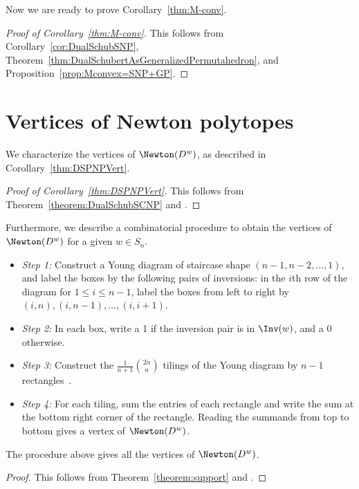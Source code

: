 Now we are ready to prove Corollary~\ref{thm:M-conv}. 
\begin{proof}[Proof of Corollary~\ref{thm:M-conv}]
    This follows from Corollary~\ref{cor:DualSchubSNP}, Theorem~\ref{thm:DualSchubertAsGeneralizedPermutahedron}, and Proposition~\ref{prop:Mconvex=SNP+GP}.
\end{proof}


\section{Vertices of Newton polytopes}\label{section:vertices}

We characterize the vertices of $\Newton(D^w)$, as described in Corollary~\ref{thm:DSPNPVert}.

\begin{proof}[Proof of Corollary~\ref{thm:DSPNPVert}]
    This follows from Theorem~\ref{theorem:DualSchubSCNP} and \cite[Theorem 3.5]{2009minkowski}.
\end{proof}

Furthermore, we describe a combinatorial procedure to obtain the vertices of $\Newton(D^w)$ for a given $w \in S_n$. 

\begin{itemize}
    \item \textit{Step 1:} Construct a Young diagram of staircase shape $(n-1, n - 2, \ldots, 1)$, and label the boxes by the following pairs of inversions: in the $i$th row of the diagram for $1\le i \le n-1$, label the boxes from left to right by $(i,n), (i,n-1), \dots, (i,i+1)$.
    \item \textit{Step 2:} In each box, write a 1 if the inversion pair is in $\Inv(w)$, and a 0 otherwise.
    \item \textit{Step 3:} Construct the $\frac{1}{n+1}\binom{2n}{n}$ tilings of the Young diagram by $n-1$ rectangles~\cite{EC2add}. 
    \item \textit{Step 4:} For each tiling, sum the entries of each rectangle and write the sum at the bottom right corner of the rectangle. Reading the summands from top to bottom gives a vertex of $\Newton(D^w)$. 


\end{itemize}

\begin{coro}
    The procedure above gives all the vertices of $\Newton(D^w)$.
\end{coro}
    
\begin{proof}
    This follows from Theorem~\ref{theorem:support} and \cite[Corollary~8.2]{postnikovpermutohedra}.
\end{proof}

